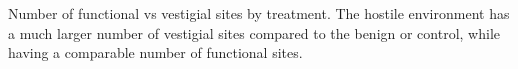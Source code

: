 Number of functional vs vestigial sites by treatment. The hostile environment has a much larger number of vestigial sites compared to the benign or control, while having a comparable number of functional sites.